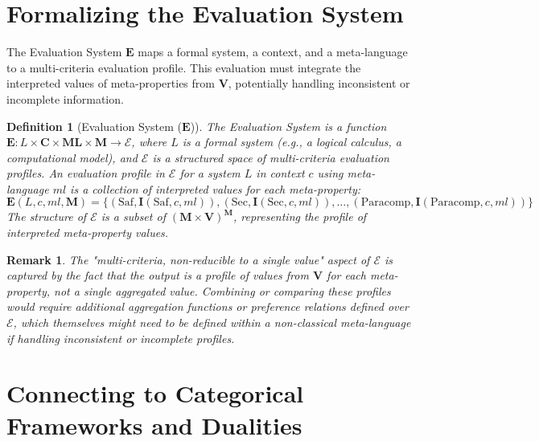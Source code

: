 \documentclass{article}
\newcommand{\MetaProps}{\mathbf{M}}
\newcommand{\ContextParams}{\mathbf{C}}
\newcommand{\InterpFunc}{\mathbf{I}}
\newcommand{\EvalSystem}{\mathbf{E}}
\newcommand{\ValueSpace}{\mathbf{V}}
\newcommand{\MetaLang}{\mathbf{ML}}
\newcommand{\Saf}{\text{Saf}}
\newcommand{\Sec}{\text{Sec}}
\newcommand{\Paracomp}{\text{Paracomp}}
\newtheorem{definition}{Definition}[section] %
\newtheorem{remark}{Remark}[section] %
\begin{document}
													\section{Formalizing the Evaluation System}
													
													The Evaluation System $\EvalSystem$ maps a formal system, a context, and a meta-language to a multi-criteria evaluation profile. This evaluation must integrate the interpreted values of meta-properties from $\ValueSpace$, potentially handling inconsistent or incomplete information.
													
													\begin{definition}[Evaluation System ($\EvalSystem$)]
														The Evaluation System is a function $\EvalSystem: L \times \ContextParams \times \MetaLang \times \MetaProps \rightarrow \mathcal{E}$, where $L$ is a formal system (e.g., a logical calculus, a computational model), and $\mathcal{E}$ is a structured space of multi-criteria evaluation profiles. An evaluation profile in $\mathcal{E}$ for a system $L$ in context $c$ using meta-language $ml$ is a collection of interpreted values for each meta-property:
														$\EvalSystem(L, c, ml, \MetaProps) = \{ (\Saf, \InterpFunc(\Saf, c, ml)), (\Sec, \InterpFunc(\Sec, c, ml)), \dots, (\Paracomp, \InterpFunc(\Paracomp, c, ml)) \}$
														The structure of $\mathcal{E}$ is a subset of $(\MetaProps \times \ValueSpace)^{\MetaProps}$, representing the profile of interpreted meta-property values.
														\end{definition}
															
															\begin{remark}
																\RaggedRight %
																The "multi-criteria, non-reducible to a single value" aspect of $\mathcal{E}$ is captured by the fact that the output is a profile of values from $\ValueSpace$ for each meta-property, not a single aggregated value. Combining or comparing these profiles would require additional aggregation functions or preference relations defined over $\mathcal{E}$, which themselves might need to be defined within a non-classical meta-language if handling inconsistent or incomplete profiles.
																\end{remark}
																	
																	\section{Connecting to Categorical Frameworks and Dualities}
																	
\end{document}
